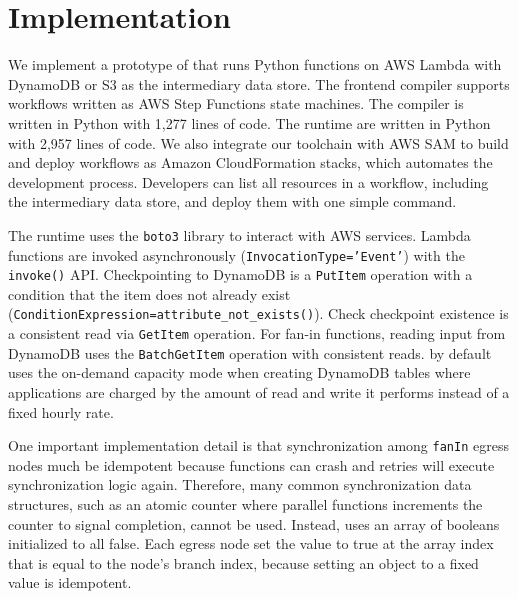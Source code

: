\section{Implementation}\label{sec:impl}

We implement a prototype of \name{} that runs Python functions on AWS Lambda
with DynamoDB or S3 as the intermediary data store. The frontend compiler
supports workflows written as AWS Step Functions state machines. The compiler
is written in Python with 1,277 lines of code.
The
runtime are written in Python with 2,957 lines of code. We also integrate our
toolchain with AWS SAM to build and deploy \name{} workflows as Amazon
CloudFormation stacks, which automates the development process. Developers can
list all resources in a workflow, including the intermediary data store, and
deploy them with one simple command.

The runtime uses the \texttt{boto3} library to interact with AWS services.
Lambda functions are invoked asynchronously (\texttt{InvocationType='Event'})
with the \texttt{invoke()} API. Checkpointing to DynamoDB is a
\texttt{PutItem} operation with a condition that the item does not already
exist (\texttt{ConditionExpression=attribute\_not\_exists()}). Check
checkpoint existence is a consistent read via \texttt{GetItem} operation. For
fan-in functions, reading input from DynamoDB uses the \texttt{BatchGetItem}
operation with consistent reads.
\name{} by default uses the on-demand capacity mode when creating DynamoDB
tables where applications are charged by the amount of read and write it
performs instead of a fixed hourly rate.

One important implementation detail is that synchronization among
\texttt{fanIn} egress nodes much be idempotent because functions can crash and
retries will execute synchronization logic again. Therefore, many common
synchronization data structures, such as an atomic counter where parallel
functions increments the counter to signal completion, cannot be used.
Instead, \name{} uses an array of booleans initialized to all false. Each
egress node set the value to true at the array index that is equal to the
node's branch index, because setting an object to a fixed value is idempotent.

